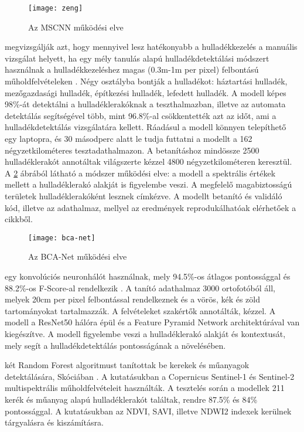 \begin{figure}[H]
	\centering
	\texttt{[image: zeng]}
	\caption{Az MSCNN működési elve \cite{zeng2019}}
    \label{fig:zeng}
\end{figure}

\citeauthor{sun2023} megvizsgálják azt, hogy mennyivel lesz hatékonyabb a hulladékkezelés a manuális vizsgálat helyett, ha egy mély tanulás alapú hulladékdetektálási módszert használnak a hulladékkezeléshez magas (0.3m-1m per pixel) felbontású műholdfelvételeken \cite{sun2023}. Négy osztályba bontják a hulladékot: háztartási hulladék, mezőgazdasági hulladék, építkezési hulladék, lefedett hulladék. A modell képes 98\%-át detektálni a hulladéklerakóknak a teszthalmazban, illetve az automata detektálás segítségével több, mint 96.8\%-al csökkentették azt az időt, ami a hulladékdetektálás vizsgálatára kellett. Ráadásul a modell könnyen telepíthető egy laptopra, és 30 másodperc alatt le tudja futtatni a modellt a 162 négyzetkilométeres tesztadathalmazon. A betanításhoz mindössze 2500 hulladéklerakót annotáltak világszerte kézzel 4800 négyzetkilométeren keresztül. A \ref{fig:bca-net-working} ábrából látható a módszer működési elve: a modell a spektrális értékek mellett a hulladéklerakó alakját is figyelembe veszi. A megfelelő magabiztosságú területek hulladéklerakóként lesznek címkézve. A modellt betanító és validáló kód, illetve az adathalmaz, mellyel az eredmények reprodukálhatóak elérhetőek a cikkből.

\begin{figure}[H]
	\centering
	\texttt{[image: bca-net]}
	\caption{Az BCA-Net működési elve \cite{sun2023}}
    \label{fig:bca-net-working}
\end{figure}

\citeauthor{Torres2021} egy konvolúciós neuronhálót használnak, mely 94.5\%-os átlagos pontossággal és 88.2\%-os F-Score-al rendelkezik \cite{Torres2021}. A tanító adathalmaz 3000 ortofotóból áll, melyek 20cm per pixel felbontással rendelkeznek és a vörös, kék és zöld tartományokat tartalmazzák. A felvételeket szakértők annotálták, kézzel. A modell a ResNet50 \cite{ResNet2016} hálóra épül és a Feature Pyramid Network \cite{FPN2017} architektúrával van kiegészítve. A modell figyelembe veszi a hulladéklerakó alakját és kontextusát, mely segít a hulladékdetektálás pontosságának a növelésében.

\citeauthor{Page2020} két Random Forest algoritmust tanítottak be kerekek és műanyagok detektálására, Skóciában \cite{Page2020}. A kutatásukban a Copernicus Sentinel-1 és Sentinel-2 multispektrális műholdfelvételeit használták. A tesztelés során a modellek 211 kerék és műanyag alapú hulladéklerakót találtak, rendre 87.5\% és 84\% pontossággal. A kutatásukban az NDVI, SAVI, illetve NDWI2 indexek kerülnek tárgyalásra és kiszámításra.

